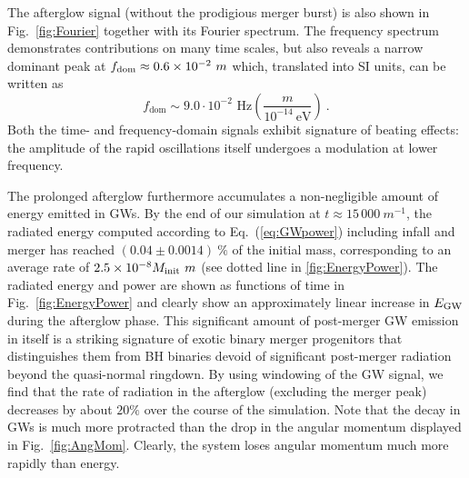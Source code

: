 \documentclass[aps,twocolumn,nofootinbib,superscriptaddress,amsfonts,floatfix
]{revtex4-1} %
\begin{document}
The afterglow signal (without the prodigious merger burst)
is also shown in Fig.~\ref{fig:Fourier} together with 
its Fourier spectrum. The frequency spectrum demonstrates
contributions on many time scales, but also reveals a
narrow dominant peak at $f_{\rm dom}\approx
0.6\times 10^{-2}~m$ which, translated into SI units, can
be written as
%
\begin{equation}
    f_{\textrm{dom}} \sim 9.0 \cdot 10^{-2}\text{ Hz} \left( \frac{m}{10^{-14}~\text{eV}}
    \right)~. \label{eqn:freqGW}
\end{equation}
%
Both the time- and frequency-domain signals exhibit signature
of beating effects: the amplitude of the rapid oscillations
itself undergoes a modulation at lower frequency.


The prolonged afterglow furthermore accumulates a non-negligible
amount of energy emitted in GWs. By the end of our simulation
at $t\approx 15\,000~m^{-1}$, the radiated energy computed
according to Eq.~(\ref{eq:GWpower}) including
infall and merger has reached
$(0.04 \pm 0.0014)~\% $ of the initial mass,
corresponding to an average rate of $2.5 \times 10^{-8} M_{\rm init}~m$ (see dotted line in \cref{fig:EnergyPower}). 
The radiated energy and power are shown
as functions of time in Fig.~\ref{fig:EnergyPower}
and clearly show an approximately linear increase in
$E_{\rm GW}$ during the afterglow phase. 
This significant amount of post-merger GW emission in itself is a
striking signature of exotic binary merger progenitors
that distinguishes them from BH binaries devoid 
of significant post-merger radiation beyond the quasi-normal ringdown. 
By using windowing of the GW signal, we find that the rate of radiation in the afterglow (excluding the merger peak) decreases by about $20 \%$ over the course of the simulation.
Note that the decay in GWs is much more protracted than the drop in the angular momentum displayed in Fig.~\ref{fig:AngMom}.
Clearly, the system loses angular momentum much more rapidly
than energy.
\end{document}
